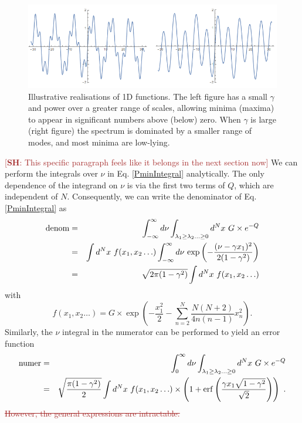 \documentclass[12pt]{article}
\newcommand{\SH}[1]{\textcolor{brown}{[{\bf SH}: #1]}}
\newcommand{\sh}[1]{\textcolor{brown}{#1}}
\begin{document}
\begin{figure}
  \centering
    \includegraphics[width=\linewidth]{TwoSigmas.png}
  \caption{Illustrative realisations of 1D functions. The left figure has a small $\gamma$ and power over a greater range of scales, allowing minima (maxima) to appear in significant numbers above (below) zero. When $\gamma$ is large (right figure) the spectrum is dominated by a smaller range of modes, and most minima are low-lying.}
  \label{examples1}
\end{figure}

\SH{This specific paragraph feels like it belongs in the next section now} We can perform the integrals over $\nu$ in Eq. \ref{PminIntegral} analytically. The only dependence of the integrand on $\nu$ is via the first two terms of $Q$, which are independent of $N$. Consequently, we can write the denominator of Eq. \ref{PminIntegral} as 
%
\begin{eqnarray}
\nonumber {\rm denom} &=&
\int^\infty_{-\infty} d\nu \int_{\lambda_1 \geq \lambda_2 \ldots \geq 0} d^Nx \,\,G \times e^{-Q} \\ 
\nonumber &=&  \int d^Nx\,\, f(x_1,x_2 \ldots )  \int^\infty_{-\infty} d\nu \,\exp\left(-\frac{(\nu- \gamma x_1)^2}{2(1-\gamma^2)}\right)\\
&=& \sqrt{2\pi (1-\gamma^2)}  \int d^N x \,\, f(x_1,x_2 \ldots )
\end{eqnarray}
%
with
%
\begin{equation} f(x_1,x_2 \ldots ) =  G\times \exp\left(-\frac{x_1^2}{2}-\sum_{n=2}^N\frac{N(N+2)}{4n(n-1)}x_n^2 \right).
\end{equation}
% 
Similarly, the $\nu$ integral in the numerator can be performed to yield an error function
%
\begin{eqnarray}
\nonumber {\rm numer} &=&
\int^\infty_{0} d\nu \int_{\lambda_1 \geq \lambda_2 \ldots \geq 0}d^N x\,\, G \times e^{-Q} \\ 
&=& \sqrt{\frac{\pi (1-\gamma^2)}{2}}  \int d^N x \,\, f(x_1,x_2 \ldots )\times \left(1+{\rm erf}\left(\frac{\gamma x_1 \sqrt{1-\gamma^2}}{\sqrt{2}}\right) \right)\,\, .
\end{eqnarray}
%
\sh{\sout{However, the general expressions are intractable. }}
%
\end{document}
